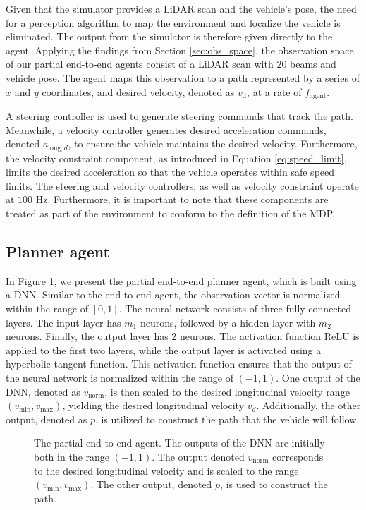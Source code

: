 Given that the simulator provides a LiDAR scan and the vehicle's pose, the need for a perception algorithm to map the environment and localize the vehicle is eliminated. 
The output from the simulator is therefore given directly to the agent.
Applying the findings from Section \ref{sec:obs_space}, the observation space of our partial end-to-end agents consist of a LiDAR scan with $20$ beams and vehicle pose.
The agent maps this observation to a path represented by a series of $x$ and $y$ coordinates, and desired velocity, denoted as $v_{\text{d}}$, at a rate of $f_{\text{agent}}$. 

A steering controller is used to generate steering commands that track the path.
Meanwhile, a velocity controller generates desired acceleration commands, denoted $a_{\text{long},d}$, to ensure the vehicle maintains the desired velocity.
Furthermore, the velocity constraint component, as introduced in Equation \ref{eq:speed_limit}, limits the desired acceleration so that the vehicle operates within safe speed limits. 
The steering and velocity controllers, as well as velocity constraint operate at $100$ Hz.
Furthermore, it is important to note that these components are treated as part of the environment to conform to the definition of the MDP. 

\subsection{Planner agent}

In Figure \ref{fig:steer_vel_agent}, we present the partial end-to-end planner agent, which is built using a DNN. 
Similar to the end-to-end agent, the observation vector is normalized within the range of $[0,1]$.
The neural network consists of three fully connected layers. The input layer has $m_1$ neurons, followed by a hidden layer with $m_2$ neurons. Finally, the output layer has $2$ neurons. 
The activation function ReLU is applied to the first two layers, while the output layer is activated using a hyperbolic tangent function. 
This activation function ensures that the output of the neural network is normalized within the range of $(-1, 1)$.
One output of the DNN, denoted as $v_{\text{norm}}$, is then scaled to the desired longitudinal velocity range $(v_{\text{min}}, v_{\text{max}})$, yielding the desired longitudinal velocity $v_{d}$. 
Additionally, the other output, denoted as $p$, is utilized to construct the path that the vehicle will follow.


\begin{figure}[htb!]
    \centering
    
    \caption[The partial end-to-end planner agent]{The partial end-to-end agent. The outputs of the DNN are initially both in the range $(-1,1)$. The output denoted $v_{\text{norm}}$ corresponds to the desired longitudinal velocity and is scaled to the range $(v_{\text{min}}, v_{\text{max}})$. The other output, denoted $p$, is used to construct the path.}
    \label{fig:steer_vel_agent}
\end{figure}



